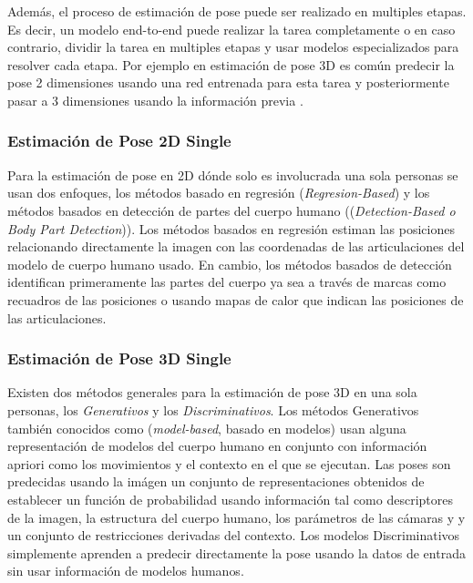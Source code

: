Además, el proceso de estimación de pose puede ser realizado en multiples etapas. Es decir, un modelo
end-to-end puede realizar la tarea completamente o en caso contrario, dividir la tarea en multiples
etapas y usar modelos especializados para resolver cada etapa. Por ejemplo en estimación de pose 3D
es común predecir la pose 2 dimensiones usando una red entrenada para esta tarea y posteriormente
pasar a 3 dimensiones usando la información previa \cite{DBLP:journals/corr/MartinezHRL17}.

\subsubsection{Estimación de Pose 2D Single}

Para la estimación de pose en 2D dónde solo es involucrada una sola personas se usan dos enfoques,
los métodos basado en regresión (\textit{Regresion-Based}) y los métodos basados en detección de
partes del cuerpo humano ((\textit{Detection-Based o Body Part Detection})). Los métodos basados en
regresión estiman las posiciones relacionando directamente la imagen con las coordenadas de las
articulaciones del modelo de cuerpo humano usado. En cambio, los métodos basados de detección
identifican primeramente las partes del cuerpo ya sea a través de marcas como recuadros de las
posiciones o usando mapas de calor que indican las posiciones de las articulaciones.

\subsubsection{Estimación de Pose 3D Single}

Existen dos métodos generales para la estimación de pose 3D en una sola personas, los
\textit{Generativos} y los \textit{Discriminativos}. Los métodos Generativos
también conocidos como (\textit{model-based}, basado en modelos) usan alguna representación de modelos
del cuerpo humano en conjunto con información apriori como los movimientos y el contexto en el que se
ejecutan. Las poses son predecidas usando la imágen un conjunto de representaciones obtenidos de establecer un
función de probabilidad usando información tal como descriptores de la imagen, la estructura del cuerpo
humano, los parámetros de las cámaras y y un conjunto de restricciones derivadas del contexto. Los
modelos Discriminativos simplemente aprenden a predecir directamente la pose usando la datos de entrada
sin usar información de modelos humanos.

